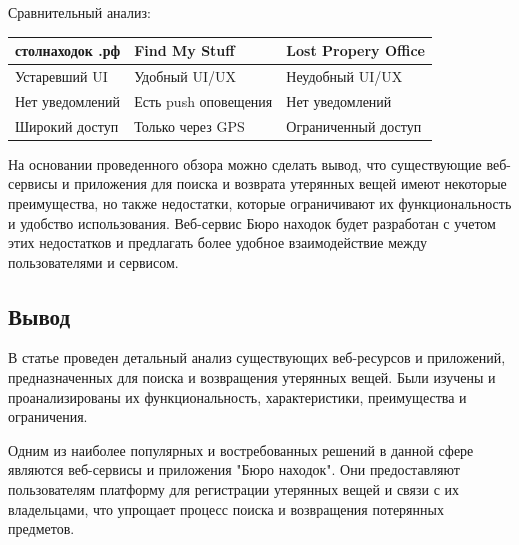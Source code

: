 \documentclass{mirea-article}
\begin{document}
\begin{multicols}{2}
		Сравнительный анализ:
		
		\begin{tabular}{ | m{5em} | m{5em}| m{5em} | } 	
			\hline
			столнаходок .рф & Find My Stuff & Lost Propery Office \\ 
			\hline
			Устаревший UI & Удобный UI/UX & Неудобный UI/UX \\ 
			\hline
			Нет уведомлений & Есть push оповещения & Нет уведомлений \\ 
			\hline
			Широкий доступ & Только через GPS & Ограничен\-ный доступ \\ 
			\hline
		\end{tabular}
		
		На основании проведенного обзора можно сделать вывод, что существующие веб-сервисы и приложения для поиска и возврата утерянных вещей имеют некоторые преимущества, но также недостатки, которые ограничивают их функциональность и удобство использования. Веб-сервис Бюро находок будет разработан с учетом этих недостатков и предлагать более удобное взаимодействие между пользователями и сервисом.
		
		\subsection*{Вывод}
		
		В статье проведен детальный анализ существующих веб-ресурсов и приложений, предназначенных для поиска и возвращения утерянных вещей. Были изучены и проанализированы их функциональность, характеристики, преимущества и ограничения.
		
		Одним из наиболее популярных и востребованных решений в данной сфере являются веб-сервисы и приложения "Бюро находок". Они предоставляют пользователям платформу для регистрации утерянных вещей и связи с их владельцами, что упрощает процесс поиска и возвращения потерянных предметов.
	\end{multicols}
	
\end{document}
